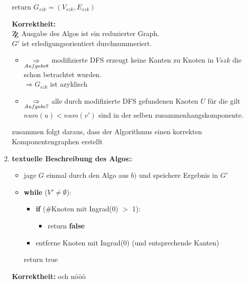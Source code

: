 \documentclass[10pt,a4paper]{article}
\newcommand{\MyArrow}{\operatornamewithlimits{\Rightarrow}}
\newcommand{\zz}{\mathrm{Z\kern-.3em\raise-0.5ex\hbox{Z}}}
\begin{document}
\begin{enumerate}[label={\alph*)}]
\begin{algorithm}[H]
{				}
				return $G_{szk} =(V_{szk}, E_{szk})$
			\end{algorithm}
			
            \textbf{Korrektheit:} \\
            $\zz$ Ausgabe des Algos ist ein reduzierter Graph. \\
           $G'$ ist erledigungsorientiert durchnummeriert. \\
            \begin{itemize}
                \item
                 
                $\MyArrow\limits_{Aufgabe 8}$ modifizierte DFS erzeugt keine
                Kanten zu Knoten in $V{szk}$ die schon betrachtet wurden. \\
                $\Rightarrow G_{szk} $ ist azyklisch
                
                \item
                
                $\MyArrow\limits_{Aufgabe 7}$ alle durch modifizierte DFS gefundenen Knoten $U$
                für die gilt $num(u) < num(v')$ sind in der selben zusammenhangskomponente.
                
            \end{itemize}
            
            zusammen folgt daraus, dass der Algorithmus einen korrekten Komponentengraphen erstellt
           
            \item
            \textbf{textuelle Beschreibung des Algos:}: \\
            \begin{itemize}
                \item jage $G$ einmal durch den Algo aus $b)$ und speichere Ergebnis in $G'$
                \item \textbf{while} ($V' \neq \emptyset$):
                \begin{itemize}
                    \item \textbf{if} (\#Knoten mit Ingrad(0) $>$ 1):
                    \begin{itemize}
                        \item return \textbf{false}
                    \end{itemize}
                    \item entferne Knoten mit Ingrad(0) (und entsprechende Kanten)

                \end{itemize}
                
                return true

            \end{itemize}
            
            \textbf{Korrektheit:}
            och nööö

	\end{enumerate}
\end{document}
